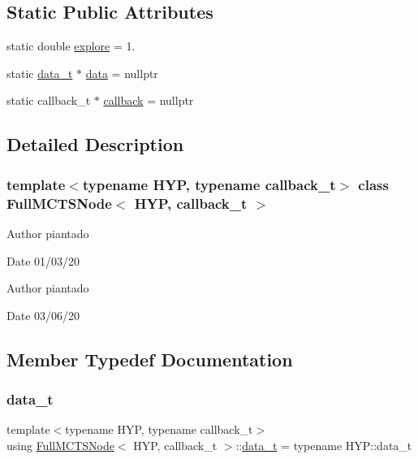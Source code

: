\subsection*{Static Public Attributes}
\begin{DoxyCompactItemize}
\item 
static double \hyperlink{class_full_m_c_t_s_node_ae81fbc8ac2b50b4f5bd91439d0e36d84}{explore} = 1.
\item 
static \hyperlink{class_full_m_c_t_s_node_a9c9c98180d9c5a799f118a79976536a6}{data\+\_\+t} $\ast$ \hyperlink{class_full_m_c_t_s_node_ab326b6830adc9d68d8cb7d3cc6e4f37f}{data} = nullptr
\item 
static callback\+\_\+t $\ast$ \hyperlink{class_full_m_c_t_s_node_a7e8ecdad10651454729d7eeac57fb045}{callback} = nullptr
\end{DoxyCompactItemize}


\subsection{Detailed Description}
\subsubsection*{template$<$typename H\+YP, typename callback\+\_\+t$>$\newline
class Full\+M\+C\+T\+S\+Node$<$ H\+Y\+P, callback\+\_\+t $>$}

\begin{DoxyAuthor}{Author}
piantado 
\end{DoxyAuthor}
\begin{DoxyDate}{Date}
01/03/20
\end{DoxyDate}
\begin{DoxyAuthor}{Author}
piantado 
\end{DoxyAuthor}
\begin{DoxyDate}{Date}
03/06/20 
\end{DoxyDate}


\subsection{Member Typedef Documentation}
\mbox{\label{class_full_m_c_t_s_node_a9c9c98180d9c5a799f118a79976536a6}} 
\subsubsection{\texorpdfstring{data\+\_\+t}{data\_t}}
{\footnotesize\ttfamily template$<$typename H\+YP, typename callback\+\_\+t$>$ \\
using \hyperlink{class_full_m_c_t_s_node}{Full\+M\+C\+T\+S\+Node}$<$ H\+YP, callback\+\_\+t $>$\+::\hyperlink{class_full_m_c_t_s_node_a9c9c98180d9c5a799f118a79976536a6}{data\+\_\+t} =  typename H\+Y\+P\+::data\+\_\+t}

